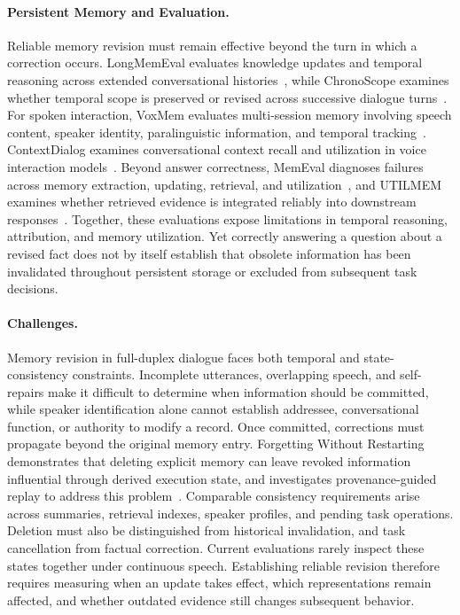\paragraph{Persistent Memory and Evaluation.}
Reliable memory revision must remain effective beyond the turn in which a correction occurs. LongMemEval evaluates knowledge updates and temporal reasoning across extended conversational histories~\citep{DBLP:conf/iclr/WuWYZCY25}, while ChronoScope examines whether temporal scope is preserved or revised across successive dialogue turns~\citep{DBLP:conf/acl/AtriJH26}. For spoken interaction, VoxMem evaluates multi-session memory involving speech content, speaker identity, paralinguistic information, and temporal tracking~\citep{DBLP:journals/corr/abs-2609-32607}. ContextDialog examines conversational context recall and utilization in voice interaction models~\citep{contextdialog}. Beyond answer correctness, MemEval diagnoses failures across memory extraction, updating, retrieval, and utilization~\citep{wang-etal-2026-memories}, and UTILMEM examines whether retrieved evidence is integrated reliably into downstream responses~\citep{qing-etal-2026-utilmem}. Together, these evaluations expose limitations in temporal reasoning, attribution, and memory utilization. Yet correctly answering a question about a revised fact does not by itself establish that obsolete information has been invalidated throughout persistent storage or excluded from subsequent task decisions.

\paragraph{Challenges.}
Memory revision in full-duplex dialogue faces both temporal and state-consistency constraints. Incomplete utterances, overlapping speech, and self-repairs make it difficult to determine when information should be committed, while speaker identification alone cannot establish addressee, conversational function, or authority to modify a record. Once committed, corrections must propagate beyond the original memory entry. Forgetting Without Restarting demonstrates that deleting explicit memory can leave revoked information influential through derived execution state, and investigates provenance-guided replay to address this problem~\citep{DBLP:journals/corr/abs-2609-04875}. Comparable consistency requirements arise across summaries, retrieval indexes, speaker profiles, and pending task operations. Deletion must also be distinguished from historical invalidation, and task cancellation from factual correction. Current evaluations rarely inspect these states together under continuous speech. Establishing reliable revision therefore requires measuring when an update takes effect, which representations remain affected, and whether outdated evidence still changes subsequent behavior.

